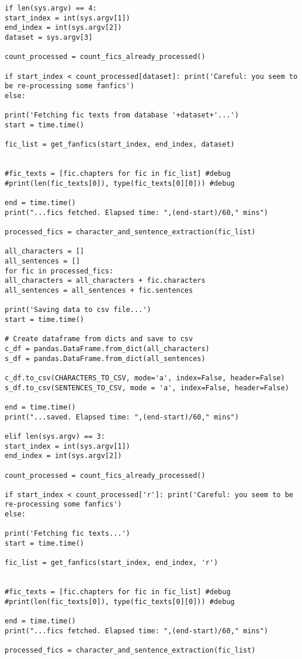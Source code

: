 \documentclass{pre-tfg}
\begin{document}
\begin{lstlisting}[style=consola]
if len(sys.argv) == 4:
start_index = int(sys.argv[1])
end_index = int(sys.argv[2])
dataset = sys.argv[3]

count_processed = count_fics_already_processed()

if start_index < count_processed[dataset]: print('Careful: you seem to be re-processing some fanfics')
else:

print('Fetching fic texts from database '+dataset+'...')
start = time.time()

fic_list = get_fanfics(start_index, end_index, dataset)


#fic_texts = [fic.chapters for fic in fic_list] #debug
#print(len(fic_texts[0]), type(fic_texts[0][0])) #debug

end = time.time()
print("...fics fetched. Elapsed time: ",(end-start)/60," mins")

processed_fics = character_and_sentence_extraction(fic_list)

all_characters = []
all_sentences = []
for fic in processed_fics: 
all_characters = all_characters + fic.characters
all_sentences = all_sentences + fic.sentences

print('Saving data to csv file...')
start = time.time()

# Create dataframe from dicts and save to csv
c_df = pandas.DataFrame.from_dict(all_characters)
s_df = pandas.DataFrame.from_dict(all_sentences)

c_df.to_csv(CHARACTERS_TO_CSV, mode='a', index=False, header=False)
s_df.to_csv(SENTENCES_TO_CSV, mode = 'a', index=False, header=False)

end = time.time()
print("...saved. Elapsed time: ",(end-start)/60," mins")

elif len(sys.argv) == 3:
start_index = int(sys.argv[1])
end_index = int(sys.argv[2])

count_processed = count_fics_already_processed()

if start_index < count_processed['r']: print('Careful: you seem to be re-processing some fanfics')
else:

print('Fetching fic texts...')
start = time.time()

fic_list = get_fanfics(start_index, end_index, 'r')


#fic_texts = [fic.chapters for fic in fic_list] #debug
#print(len(fic_texts[0]), type(fic_texts[0][0])) #debug

end = time.time()
print("...fics fetched. Elapsed time: ",(end-start)/60," mins")

processed_fics = character_and_sentence_extraction(fic_list)


\end{lstlisting}
\end{document}

